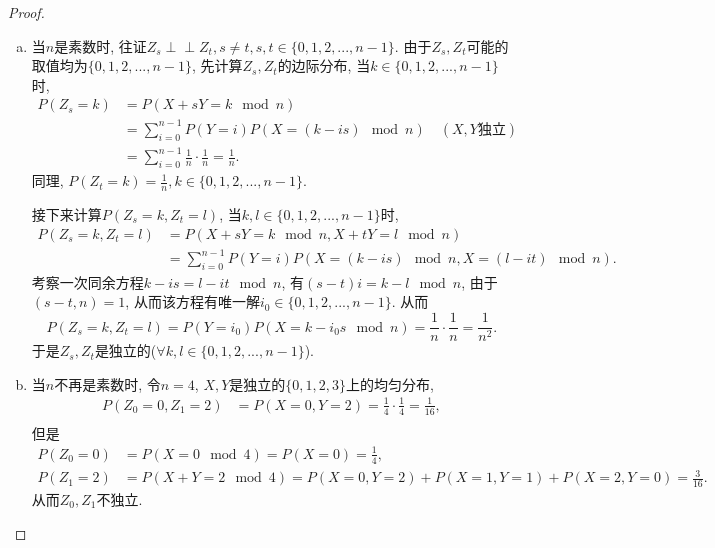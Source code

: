 \documentclass[UTF8, a4paper]{article}
\newcommand{\Perp}{\perp\!\!\!\!\perp}
\begin{document}
\begin{proof}
\begin{enumerate}[a)]
    \item 当\(n\)是素数时, 往证\(Z_s \Perp Z_t, s\neq t, s,t \in \{0,1,2,...,n-1\}\).
由于\(Z_s, Z_t\)可能的取值均为\(\{0,1,2,...,n-1\}\), 
先计算\(Z_s, Z_t\)的边际分布, 当\(k \in \{0,1,2,...,n-1\}\)时,
$$
\begin{aligned}
    P(Z_s = k) &= P(X + sY= k  \mod n ) \\
    &= \sum_{i=0}^{n-1} P(Y = i)P(X = (k-is) \mod n) \quad (X,Y\text{独立})\\
    &= \sum_{i=0}^{n-1} \frac{1}{n}\cdot \frac{1}{n} = \frac{1}{n}.
\end{aligned}
$$
同理, \(P(Z_t = k) = \frac{1}{n}, k \in \{0,1,2,...,n-1\}\).

接下来计算\(P(Z_s = k, Z_t = l)\), 当\(k, l \in \{0,1,2,...,n-1\}\)时,
$$
\begin{aligned}
    P(Z_s = k, Z_t = l) &= P(X + sY  = k\mod n, X + tY  = l\mod n) \\
    &= \sum_{i=0}^{n-1} P(Y = i)P(X = (k-is) \mod n, X = (l-it) \mod n) .
\end{aligned}
$$
考察一次同余方程\(k-is = l-it \mod n\), 有\((s-t)i = k-l \mod n\), 由于\((s-t, n) = 1\), 从而该方程有唯一解\(i_0 \in \{0,1,2,...,n-1\}\). 
从而
$$
P(Z_s = k, Z_t = l) = P(Y = i_0) P(X = k - i_0 s \mod n) = \frac{1}{n}\cdot \frac{1}{n} = \frac{1}{n^2}.
$$
于是\(Z_s, Z_t\)是独立的(\(\forall k, l \in \{0,1,2,...,n-1\}\)).

\item 当\(n\)不再是素数时, 令\(n = 4\), \(X, Y\)是独立的\(\{0,1,2,3\}\)上的均匀分布,
$$
\begin{aligned}
    P(Z_0 = 0, Z_1 = 2) &= P(X = 0, Y = 2) = \frac{1}{4}\cdot \frac{1}{4} = \frac{1}{16}, \\
\end{aligned}
$$
但是
$$
\begin{aligned}
    P(Z_0 = 0) &= P(X = 0 \mod 4) = P(X = 0) = \frac{1}{4}, \\
    P(Z_1 = 2) &= P(X + Y = 2 \mod 4) = P(X = 0, Y = 2) + P(X = 1, Y = 1) + P(X = 2, Y = 0) = \frac{3}{16}.
\end{aligned}
$$
从而\(Z_0, Z_1\)不独立.
\end{enumerate}
\end{proof}
\end{document}
